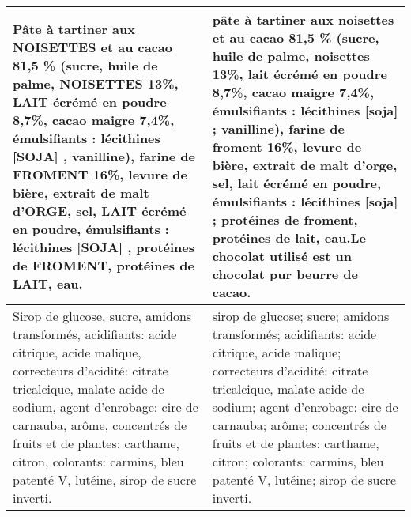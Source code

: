 \begin{longtable}{p{7cm}p{7cm}}
                                                                                                                                                                                                                                                                                                                                                                                                                                              Pâte à tartiner aux NOISETTES et au cacao 81,5 \% (sucre, huile de palme, NOISETTES 13\%, LAIT écrémé en poudre 8,7\%, cacao maigre 7,4\%, émulsifiants : lécithines [SOJA] , vanilline), farine de FROMENT 16\%, levure de bière, extrait de malt d'ORGE, sel, LAIT écrémé en poudre, émulsifiants : lécithines [SOJA] , protéines de FROMENT, protéines de LAIT, eau. &                                                                                                                                                                                                                                                                                                                                                                               pâte à tartiner aux noisettes et au cacao 81,5 \% (sucre, huile de palme, noisettes 13\%, lait écrémé en poudre 8,7\%, cacao maigre 7,4\%, émulsifiants : lécithines [soja] ; vanilline), farine de froment 16\%, levure de bière, extrait de malt d'orge, sel, lait écrémé en poudre, émulsifiants : lécithines [soja] ; protéines de froment, protéines de lait, eau.\newline Le chocolat utilisé est un chocolat pur beurre de cacao. \\ \hline
                                                                                                                                                                                                                                                                                                                                                                                                                                                                             Sirop de glucose, sucre, amidons transformés, acidifiants: acide citrique, acide malique, correcteurs d'acidité: citrate tricalcique, malate acide de sodium, agent d'enrobage: cire de carnauba, arôme, concentrés de fruits et de plantes: carthame, citron, colorants: carmins, bleu patenté V, lutéine, sirop de sucre inverti. &                                                                                                                                                                                                                                                                                                                                                                                                                                                                        sirop de glucose; sucre; amidons transformés; acidifiants: acide citrique, acide malique; correcteurs d'acidité: citrate tricalcique, malate acide de sodium; agent d'enrobage: cire de carnauba; arôme; concentrés de fruits et de plantes: carthame, citron; colorants: carmins, bleu patenté V, lutéine; sirop de sucre inverti. \\ \hline

\end{longtable}
